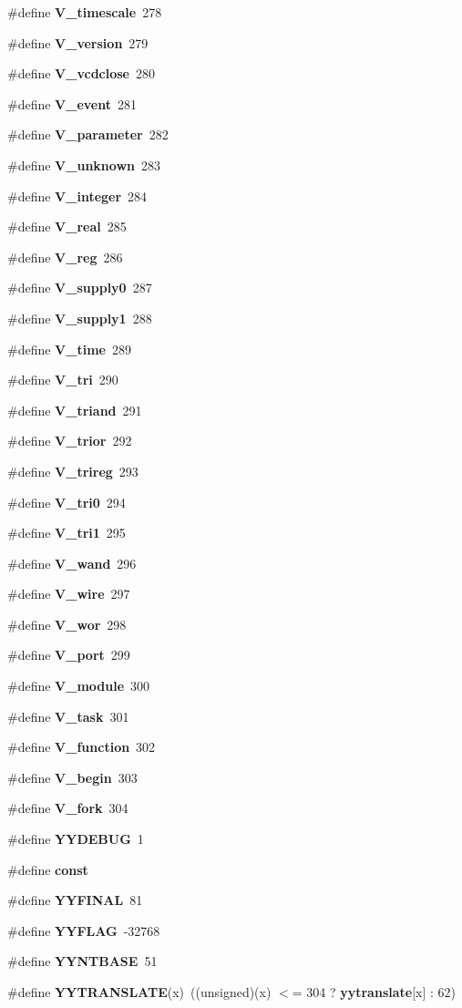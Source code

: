 \begin{CompactItemize}
\item 
\#define {\bf V\_\-timescale}\ 278
\item 
\#define {\bf V\_\-version}\ 279
\item 
\#define {\bf V\_\-vcdclose}\ 280
\item 
\#define {\bf V\_\-event}\ 281
\item 
\#define {\bf V\_\-parameter}\ 282
\item 
\#define {\bf V\_\-unknown}\ 283
\item 
\#define {\bf V\_\-integer}\ 284
\item 
\#define {\bf V\_\-real}\ 285
\item 
\#define {\bf V\_\-reg}\ 286
\item 
\#define {\bf V\_\-supply0}\ 287
\item 
\#define {\bf V\_\-supply1}\ 288
\item 
\#define {\bf V\_\-time}\ 289
\item 
\#define {\bf V\_\-tri}\ 290
\item 
\#define {\bf V\_\-triand}\ 291
\item 
\#define {\bf V\_\-trior}\ 292
\item 
\#define {\bf V\_\-trireg}\ 293
\item 
\#define {\bf V\_\-tri0}\ 294
\item 
\#define {\bf V\_\-tri1}\ 295
\item 
\#define {\bf V\_\-wand}\ 296
\item 
\#define {\bf V\_\-wire}\ 297
\item 
\#define {\bf V\_\-wor}\ 298
\item 
\#define {\bf V\_\-port}\ 299
\item 
\#define {\bf V\_\-module}\ 300
\item 
\#define {\bf V\_\-task}\ 301
\item 
\#define {\bf V\_\-function}\ 302
\item 
\#define {\bf V\_\-begin}\ 303
\item 
\#define {\bf V\_\-fork}\ 304
\item 
\#define {\bf YYDEBUG}\ 1
\item 
\#define {\bf const}
\item 
\#define {\bf YYFINAL}\ 81
\item 
\#define {\bf YYFLAG}\ -32768
\item 
\#define {\bf YYNTBASE}\ 51
\item 
\#define {\bf YYTRANSLATE}(x)\ ((unsigned)(x) $<$= 304 ? {\bf yytranslate}[x] : 62)

\end{CompactItemize}
